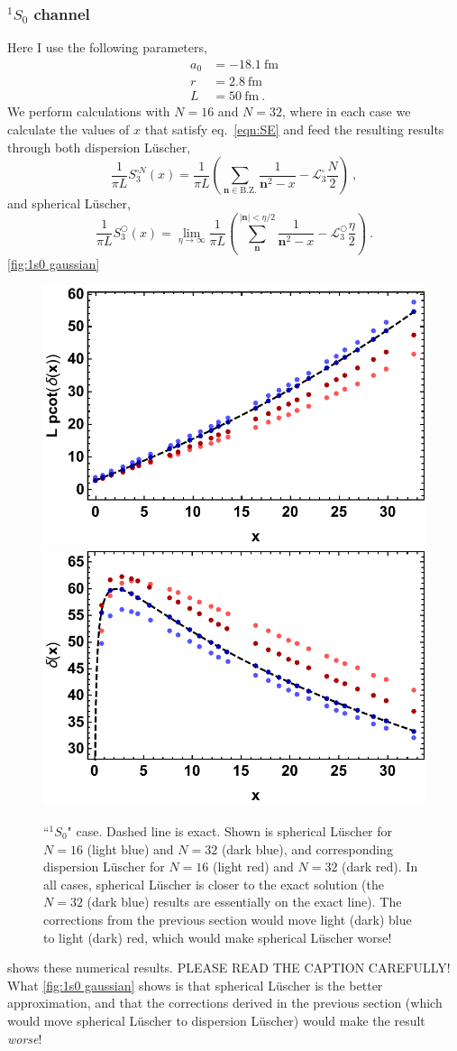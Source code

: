 \documentclass[11pt]{article}
\begin{document}
\subsubsection{$^1S_0$ channel}
Here I use the following parameters,
\begin{align*}
a_0&=-18.1\ \mathrm{ fm}\\
r&=2.8\ \mathrm{ fm}\\
L&=50\ \mathrm{ fm}\ .
\end{align*}
We perform calculations with $N=16$ and $N=32$, where in each case we calculate the values of $x$ that satisfy eq.~\eqref{eqn:SE} and feed the resulting results through both dispersion L\"uscher,
\begin{equation}\label{eqn:dispersion luscher}
\frac{1}{\pi L}S^{\square N}_3(x)=\frac{1}{\pi L}\left(\sum_{\bm n\in\mathrm{B.Z.}}\frac{1}{\bm n^{2}-x}-\mathcal{L}^\square_3\frac{N}{2}\right)\ ,
\end{equation}
and spherical L\"uscher,
\begin{equation}
\frac{1}{\pi L}S^\bigcirc_3(x)=\lim_{\eta \to\infty}\frac{1}{\pi L}\left(\sum_{\bm n}^{|\bm n|<\eta / 2} \frac{1}{\bm n^{2}-x}-\mathcal{L}^\bigcirc_3\frac{\eta}{2}\right)\ .
\end{equation}
\autoref{fig:1s0 gaussian}
\begin{figure}
\includegraphics[width=.5\textwidth]{figs/pcotd_1S0_gaussian.pdf}\includegraphics[width=.5\textwidth]{figs/delta_1S0_gaussian.pdf}
\caption{``$^1S_0$" case.  Dashed line is exact.  Shown is spherical L\"uscher for $N=16$ (light blue) and $N=32$ (dark blue), and corresponding dispersion L\"uscher for $N=16$ (light red) and $N=32$ (dark red). In all cases, spherical L\"uscher is closer to the exact solution (the $N=32$ (dark blue) results are essentially on the exact line).  The corrections from the previous section would move light (dark) blue to light (dark) red, which would make spherical L\"uscher worse!\label{fig:1s0 gaussian}}
\end{figure}
shows these numerical results.  PLEASE READ THE CAPTION CAREFULLY!  What \autoref{fig:1s0 gaussian} shows is that spherical L\"uscher is the better approximation, and that the corrections derived in the previous section (which would move spherical L\"uscher to dispersion L\"uscher) would make the result \emph{worse}!
\end{document}
